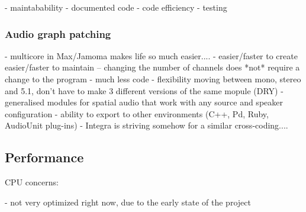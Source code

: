 \documentclass[twoside,a4paper]{article}
\begin{document}

- maintabability
- documented code
- code efficiency
- testing


%
%
%


\subsubsection{Audio graph patching} %


- multicore in Max/Jamoma makes life so much easier....
- easier/faster to create easier/faster to maintain -- changing the number of channels does *not* require a change to the program
- much less code
- flexibility moving between mono, stereo and 5.1, don't have to make 3 different versions of the same mopule (DRY)
- generalised modules for spatial audio that work with any source and speaker configuration
- ability to export to other environments (C++, Pd, Ruby, AudioUnit plug-ins)
- Integra is striving somehow for a similar cross-coding....



\subsection{Performance} %

CPU concerns:

- not very optimized right now, due to the early state of the project
\end{document}
